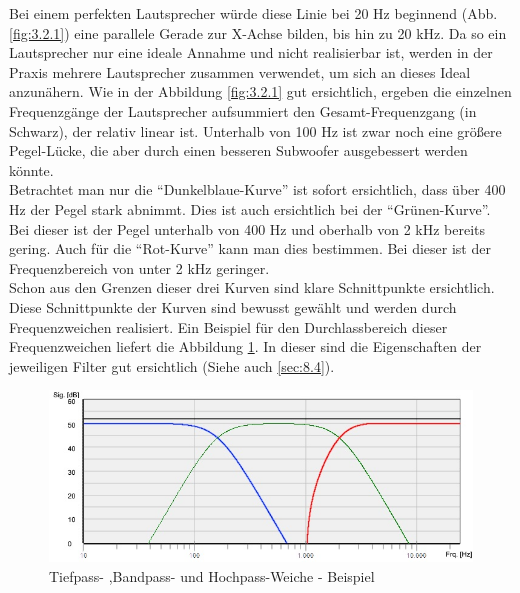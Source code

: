 Bei einem perfekten Lautsprecher würde diese Linie bei 20 Hz beginnend (Abb. \ref{fig:3.2.1}) eine parallele Gerade zur X-Achse bilden, bis hin zu 20 kHz.
Da so ein Lautsprecher nur eine ideale Annahme und nicht realisierbar ist, werden in der Praxis mehrere Lautsprecher zusammen verwendet, um sich an dieses Ideal anzunähern.
Wie in der Abbildung \ref{fig:3.2.1} gut ersichtlich, ergeben die einzelnen Frequenzgänge der Lautsprecher aufsummiert den Gesamt-Frequenzgang (in Schwarz), der relativ linear ist.
Unterhalb von 100 Hz ist zwar noch eine größere Pegel-Lücke, die aber durch einen besseren Subwoofer ausgebessert werden könnte.\\
Betrachtet man nur die \enquote{Dunkelblaue-Kurve} ist sofort ersichtlich, dass über 400 Hz der Pegel stark abnimmt.
Dies ist auch ersichtlich bei der \enquote{Grünen-Kurve}.
Bei dieser ist der Pegel unterhalb von 400 Hz und oberhalb von 2 kHz bereits gering.
Auch für die \enquote{Rot-Kurve} kann man dies bestimmen.
Bei dieser ist der Frequenzbereich von unter 2 kHz geringer.
\\
Schon aus den Grenzen dieser drei Kurven sind klare Schnittpunkte ersichtlich.
Diese Schnittpunkte der Kurven sind bewusst gewählt und werden durch Frequenzweichen realisiert.
Ein Beispiel für den Durchlassbereich dieser Frequenzweichen liefert die Abbildung \ref{fig:3.2.2}.
In dieser sind die Eigenschaften der jeweiligen Filter gut ersichtlich (Siehe auch \ref{sec:8.4}).
\begin{figure} [H]
	\centering
	\includegraphics[width=1\textwidth]{img/Grundlagen/Mehrweg-Lautsprechersysteme/Frequenzbereiche-Audio-Weiche-cut.jpg}
	\caption{Tiefpass- ,Bandpass- und Hochpass-Weiche - Beispiel}
	\label{fig:3.2.2}
\end{figure}

